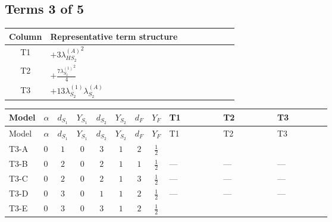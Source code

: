 \documentclass[8pt]{article}
\begin{document}
\begin{landscape}
\subsection*{Terms 3 of 5}
\begin{center}
\begin{tabular}{@{}c >{\raggedright\arraybackslash}p{0.82\linewidth}@{}}
\toprule
Column & Representative term structure \\
\midrule
T1 & \(\displaystyle +3 {\lambda_{HS_2}^{(A)}}^2\) \\
\midrule
T2 & \(\displaystyle +\frac{7 {\lambda_{S_2}^{(1)}}^2}{4}\) \\
\midrule
T3 & \(\displaystyle +13 {\lambda_{S_2}^{(1)}} {\lambda_{S_2}^{(A)}}\) \\
\midrule
\bottomrule
\end{tabular}
\end{center}
\smallskip
\tiny
\begin{longtable}{@{}llcccccc >{\raggedright\arraybackslash}p{0.21\linewidth} >{\raggedright\arraybackslash}p{0.21\linewidth} >{\raggedright\arraybackslash}p{0.21\linewidth}@{}}
\toprule
Model & $\alpha$ & $d_{S_1}$ & $Y_{S_1}$ & $d_{S_2}$ & $Y_{S_2}$ & $d_F$ & $Y_F$ & T1 & T2 & T3 \\
\midrule
\endfirsthead
\toprule
Model & $\alpha$ & $d_{S_1}$ & $Y_{S_1}$ & $d_{S_2}$ & $Y_{S_2}$ & $d_F$ & $Y_F$ & T1 & T2 & T3 \\
\midrule
\endhead
T3-A & $0$ & $1$ & $0$ & $3$ & $1$ & $2$ & $\frac{1}{2}$ & \scriptsize\adjustbox{max width=\linewidth}{$\begin{gathered} +3 {\lambda_{HS_2}^{(A)}}^2\end{gathered}$} & \scriptsize\adjustbox{max width=\linewidth}{$\begin{gathered} +\frac{7 {\lambda_{S_2}^{(1)}}^2}{4}\end{gathered}$} & \scriptsize\adjustbox{max width=\linewidth}{$\begin{gathered} +13 {\lambda_{S_2}^{(1)}} {\lambda_{S_2}^{(A)}}\end{gathered}$} \\
\midrule
T3-B & $0$ & $2$ & $0$ & $2$ & $1$ & $1$ & $\frac{1}{2}$ & --- & --- & --- \\
\midrule
T3-C & $0$ & $2$ & $0$ & $2$ & $1$ & $3$ & $\frac{1}{2}$ & --- & --- & --- \\
\midrule
T3-D & $0$ & $3$ & $0$ & $1$ & $1$ & $2$ & $\frac{1}{2}$ & --- & --- & --- \\
\midrule
T3-E & $0$ & $3$ & $0$ & $3$ & $1$ & $2$ & $\frac{1}{2}$ & \scriptsize\adjustbox{max width=\linewidth}{$\begin{gathered} +3 {\lambda_{HS_2}^{(A)}}^2\end{gathered}$} & \scriptsize\adjustbox{max width=\linewidth}{$\begin{gathered} +\frac{7 {\lambda_{S_2}^{(1)}}^2}{4}\end{gathered}$} & \scriptsize\adjustbox{max width=\linewidth}{$\begin{gathered} +13 {\lambda_{S_2}^{(1)}} {\lambda_{S_2}^{(A)}}\end{gathered}$} \\

\end{longtable}
\end{landscape}
\end{document}
